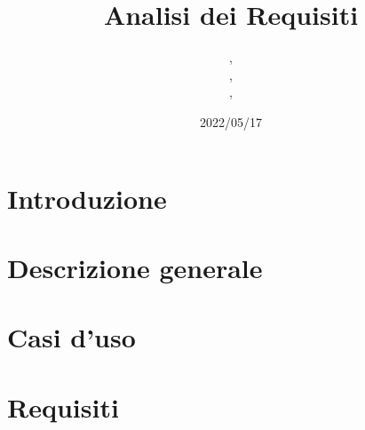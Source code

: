 \documentclass{classes/base}
\title{Analisi dei Requisiti}
\date{2022/05/17}
\author{\angela{},\\ \marcob{},\\ \giulio{},\\ \marcov{}}
\begin{document}
	\maketitle
	\newpage
	
	\newpage
	\tableofcontents
	\newpage
	\listoftables
	\newpage
	\listoffigures
  
	\newpage
	\section{Introduzione}
	

	\newpage
	\section{Descrizione generale}
	

	\newpage
	\section{Casi d'uso}
	

	\newpage
	\section{Requisiti}
	
\end{document}
